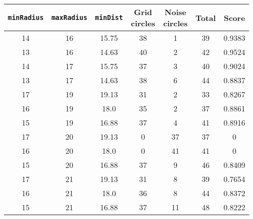 \documentclass[letterpaper, 12pt]{article}
\begin{document}
\begin{longtable}{|c|c|c|c|c|c|c|}
\hline
\textbf{\texttt{minRadius}} & \textbf{\texttt{maxRadius}} & \textbf{\texttt{minDist}} & \textbf{Grid circles} & \textbf{Noise circles} & \textbf{Total} & \textbf{Score} \\
\hline
14 & 16 & 15.75 & 38 & 1 & 39 & 0.9383 \\
\hline
13 & 16 & 14.63 & 40 & 2 & 42 & 0.9524 \\
\hline
14 & 17 & 15.75 & 37 & 3 & 40 & 0.9024 \\
\hline
13 & 17 & 14.63 & 38 & 6 & 44 & 0.8837 \\
\hline
17 & 19 & 19.13 & 31 & 2 & 33 & 0.8267 \\
\hline
16 & 19 & 18.0 & 35 & 2 & 37 & 0.8861 \\
\hline
15 & 19 & 16.88 & 37 & 4 & 41 & 0.8916 \\
\hline
17 & 20 & 19.13 & 0 & 37 & 37 & 0 \\
\hline
16 & 20 & 18.0 & 0 & 41 & 41 & 0 \\
\hline
15 & 20 & 16.88 & 37 & 9 & 46 & 0.8409 \\
\hline
17 & 21 & 19.13 & 31 & 8 & 39 & 0.7654 \\
\hline
16 & 21 & 18.0 & 36 & 8 & 44 & 0.8372 \\
\hline
15 & 21 & 16.88 & 37 & 11 & 48 & 0.8222 \\
\hline
\end{longtable}
\end{document}
